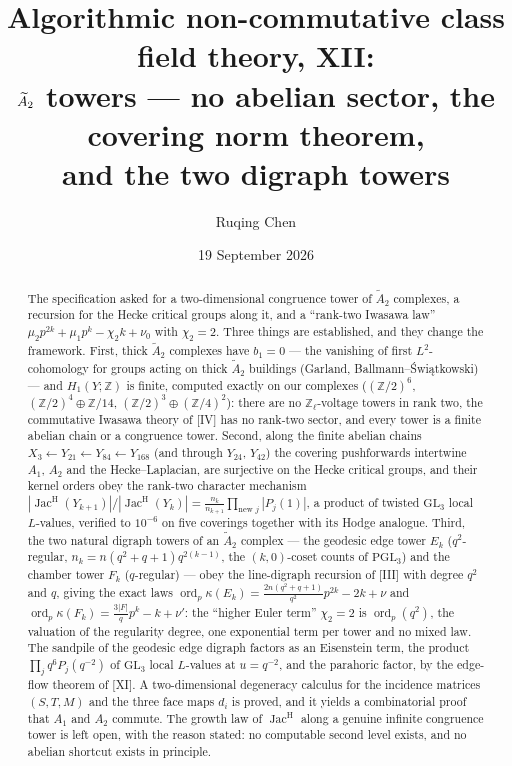 \documentclass[11pt]{amsart}
\title[Algorithmic non-commutative class field theory, XII]
{Algorithmic non-commutative class field theory, XII:\\
$\Atwo$ towers --- no abelian sector, the covering norm theorem,\\ and the two digraph towers}
\author{Ruqing Chen}
\date{19 September 2026}
\numberwithin{equation}{section}
\theoremstyle{definition}
\theoremstyle{remark}
\newcommand{\Z}{\mathbb{Z}}
\newcommand{\Jac}{\operatorname{Jac}}
\newcommand{\ord}{\operatorname{ord}}
\newcommand{\PGL}{\mathrm{PGL}}
\newcommand{\Atwo}{\widetilde A_2}
\newcommand{\JacH}{\Jac^{\mathrm{H}}}
\begin{document}
\begin{abstract}
The specification asked for a two-dimensional congruence tower of $\Atwo$ complexes, a
recursion for the Hecke critical groups along it, and a ``rank-two Iwasawa law''
$\mu_2p^{2k}+\mu_1p^{k}-\chi_2k+\nu_0$ with $\chi_2=2$. Three things are established, and they
change the framework. First, thick $\Atwo$ complexes have $b_1=0$ --- the vanishing of first
$L^{2}$-cohomology for groups acting on thick $\Atwo$ buildings (Garland,
Ballmann--\'Swi\k{a}tkowski) --- and $H_1(Y;\Z)$ is finite, computed exactly on our complexes
($(\Z/2)^{6}$, $(\Z/2)^{4}\oplus\Z/14$, $(\Z/2)^{3}\oplus(\Z/4)^{2}$): there are no
$\Z_\ell$-voltage towers in rank two, the commutative Iwasawa theory of [IV] has no rank-two
sector, and every tower is a finite abelian chain or a congruence tower. Second, along the
finite abelian chains $X_3\leftarrow Y_{21}\leftarrow Y_{84}\leftarrow Y_{168}$ (and through
$Y_{24}$, $Y_{42}$) the covering pushforwards intertwine $A_1$, $A_2$ and the Hecke--Laplacian,
are surjective on the Hecke critical groups, and their kernel orders obey the rank-two
character mechanism $|\JacH(Y_{k+1})|/|\JacH(Y_k)|=\frac{n_k}{n_{k+1}}\prod_{\text{new }j}
|P_j(1)|$, a product of twisted $\mathrm{GL}_3$ local $L$-values, verified to $10^{-6}$ on
five coverings together with its Hodge analogue. Third, the two natural digraph towers of an
$\Atwo$ complex --- the geodesic edge tower $E_k$ ($q^{2}$-regular, $n_k=n(q^{2}+q+1)q^{2(k-1)}$,
the $(k,0)$-coset counts of $\PGL_3$) and the chamber tower $F_k$ ($q$-regular) --- obey the
line-digraph recursion of [III] with degree $q^{2}$ and $q$, giving the exact laws
$\ord_p\kappa(E_k)=\frac{2n(q^{2}+q+1)}{q^{2}}p^{2k}-2k+\nu$ and
$\ord_p\kappa(F_k)=\frac{3|F|}{q}p^{k}-k+\nu'$: the ``higher Euler term'' $\chi_2=2$ is
$\ord_p(q^{2})$, the valuation of the regularity degree, one exponential term per tower and
no mixed law. The sandpile of the geodesic edge digraph factors as an Eisenstein term, the
product $\prod_jq^{6}P_j(q^{-2})$ of $\mathrm{GL}_3$ local $L$-values at $u=q^{-2}$, and the
parahoric factor, by the edge-flow theorem of [XI]. A two-dimensional degeneracy calculus for
the incidence matrices $(S,T,M)$ and the three face maps $d_i$ is proved, and it yields a
combinatorial proof that $A_1$ and $A_2$ commute. The growth law of $\JacH$ along a genuine
infinite congruence tower is left open, with the reason stated: no computable second level
exists, and no abelian shortcut exists in principle.
\end{abstract}
\end{document}
